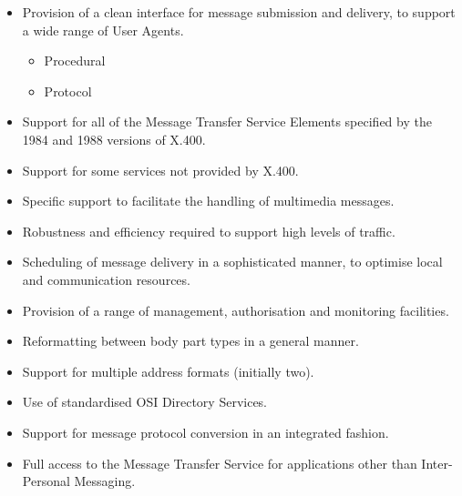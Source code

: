 \begin {bwslide}

\begin {itemize}
\item Provision of a clean interface for message submission and
delivery, to support a wide range of User Agents.
\begin {itemize}
\item Procedural
\item Protocol
\end {itemize}

\item Support for all of the Message Transfer Service Elements specified by
the 1984 and 1988 versions of X.400.

\item Support for some services not provided by X.400.

\item Specific support to facilitate the handling of multimedia
messages.

\item Robustness and efficiency required to support high levels of
traffic.

\item Scheduling of message delivery in a sophisticated manner, to 
optimise local and communication resources.
\end {itemize}
\end {bwslide}

\begin {bwslide}

\begin {itemize}
\item Provision of a range of management, authorisation and monitoring
facilities.

\item Reformatting between body part types in a general manner.

\item Support for multiple address formats (initially two).

\item Use of
standardised OSI Directory Services.

\item Support for message protocol conversion in an integrated
fashion.

\item Full access to the Message Transfer Service for applications
other than Inter-Personal Messaging.

\end {itemize}
\end {bwslide}


